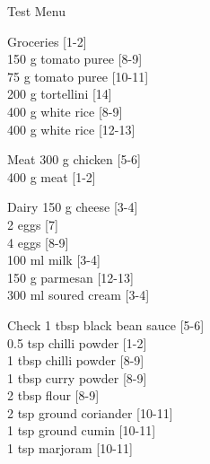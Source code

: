 \begin{menu}{Test Menu}
\begin{shoppinglist}{Groceries}
        {\scriptsize[1-2]}\\
      150 g tomato puree 
        {\scriptsize[8-9]}\\
      75 g tomato puree 
        {\scriptsize[10-11]}\\
      200 g tortellini 
        {\scriptsize[14]}\\
      400 g white rice 
        {\scriptsize[8-9]}\\
      400 g white rice 
        {\scriptsize[12-13]}\\
      \end{shoppinglist}%
      \par\vfil %
      \begin{shoppinglist}{Meat}
      300 g chicken 
        {\scriptsize[5-6]}\\
      400 g meat 
        {\scriptsize[1-2]}\\
      \end{shoppinglist}%
      \begin{shoppinglist}{Dairy}
      150 g cheese 
        {\scriptsize[3-4]}\\
      2  eggs 
        {\scriptsize[7]}\\
      4  eggs 
        {\scriptsize[8-9]}\\
      100 ml milk 
        {\scriptsize[3-4]}\\
      150 g parmesan 
        {\scriptsize[12-13]}\\
      300 ml soured cream 
        {\scriptsize[3-4]}\\
      \end{shoppinglist}%
      \par\vfil %
      \vfil\clearpage %
      \begin{shoppinglist}{Check}
      1 tbsp black bean sauce 
        {\scriptsize[5-6]}\\
      0.5 tsp chilli powder 
        {\scriptsize[1-2]}\\
      1 tbsp chilli powder 
        {\scriptsize[8-9]}\\
      1 tbsp curry powder 
        {\scriptsize[8-9]}\\
      2 tbsp flour 
        {\scriptsize[8-9]}\\
      2 tsp ground coriander 
        {\scriptsize[10-11]}\\
      1 tsp ground cumin 
        {\scriptsize[10-11]}\\
      1 tsp marjoram 
        {\scriptsize[10-11]}\\

\end{shoppinglist}
\end{menu}
